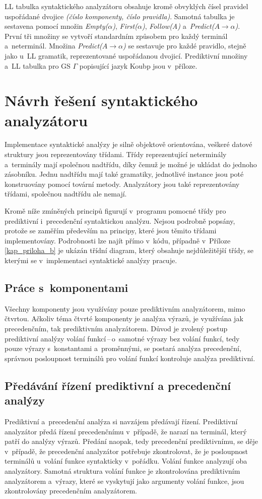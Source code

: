 LL tabulka syntaktického analyzátoru obsahuje kromě obvyklých čísel pravidel uspořádané dvojice \emph{(číslo komponenty, číslo pravidla)}.
Samotná tabulka je sestavena pomocí množin \emph{Empty($\alpha$)}, \emph{First($\alpha$)}, \emph{Follow(A)} a~\emph{Predict($A \rightarrow \alpha$)}.
První tři množiny se vytvoří standardním způsobem pro každý terminál a~neterminál.
Množina \emph{Predict($A \rightarrow \alpha$)} se sestavuje pro každé pravidlo, stejně jako u~LL gramatik, reprezentované uspořádanou dvojicí.
Prediktivní množiny a~LL tabulka pro GS $\Gamma$ popisující jazyk Koubp jsou v~příloze. 

\section{Návrh řešení syntaktického analyzátoru}\label{kap_reseni_sa}
Implementace syntaktické analýzy je silně objektově orientována, veškeré datové struktury jsou reprezentovány třídami.
Třídy reprezentující neterminály a~terminály mají společnou nadtřídu, díky čemuž je možné je ukládat do jednoho zásobníku.
Jednu nadtřídu mají také gramatiky, jednotlivé instance jsou poté konstruovány pomocí tovární metody.
Analyzátory jsou také reprezentovány třídami, společnou nadtřídu ale nemají.

Kromě níže zmíněných principů figurují v~programu pomocné třídy pro prediktivní i~precedenční syntaktickou analýzu.
Nejsou podrobně popsány, protože se zaměřím především na principy, které jsou těmito třídami implementovány.
Podrobnosti lze najít přímo v~kódu, případně v~Příloze \ref{kap_priloha_b} je ukázán třídní diagram, který obsahuje nejdůležitější třídy, se kterými se v~implementaci syntaktické analýzy pracuje.

\subsection*{Práce s~komponentami}
Všechny komponenty jsou využívány pouze prediktivním analyzátorem, mimo čtvrtou.
Ačkoliv téma čtvrté komponenty je analýza výrazů, je využívána jak precedenčním, tak prediktivním analyzátorem.
Důvod je zvolený postup prediktivní analýzy volání funkcí\,--\,o~samotné výrazy bez volání funkcí, tedy pouze výrazy s~konstantami a~proměnnými, se postará analýza precedenční, správnou posloupnost terminálů pro volání funkcí kontroluje analýza prediktivní.


\subsection*{Předávání řízení prediktivní a precedenční analýzy}
Prediktivní a~precedenční analýza si navzájem předávají řízení.
Prediktivní analyzátor předá řízení precedenčnímu v~případě, že narazí na terminál, který patří do analýzy výrazů.
Předání naopak, tedy precedenční prediktivnímu, se děje v~případě, že precedenční analyzátor potřebuje zkontrolovat, že je posloupnost terminálů u~volání funkce syntakticky v~pořádku.
Volání funkce analyzují oba analyzátory.
Samotná struktura volání funkce je zkontrolována prediktivním analyzátorem a~výrazy, které se vyskytují jako argumenty volání funkce, jsou zkontrolovány precedenčním analyzátorem.

